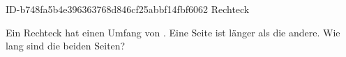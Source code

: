 \begin{exercise}
      {ID-b748fa5b4e396363768d846cf25abbf14fbf6062}
      {Rechteck}
  \ifproblem\problem\par
    Ein Rechteck hat einen Umfang von . Eine Seite ist  länger
    als die andere. Wie lang sind die beiden Seiten?
  \fi
\end{exercise}
